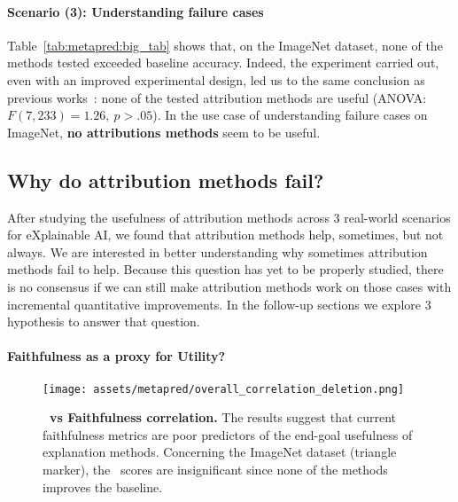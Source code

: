 \paragraph{Scenario (3): Understanding failure cases}

Table~\ref{tab:metapred:big_tab} shows that, on the ImageNet dataset, none of the methods tested exceeded baseline accuracy.  Indeed, the experiment carried out, even with an improved experimental design, led us to the same conclusion as previous works~\cite{shen2020useful}: none of the tested attribution methods are useful (ANOVA: $F(7, 233) = 1.26,\ p>.05$). 
In the use case of understanding failure cases on ImageNet, \textbf{no attributions methods} seem to be useful.

\subsection*{Why do attribution methods fail?}
After studying the usefulness of attribution methods across 3 real-world scenarios for eXplainable AI, we found that attribution methods help, sometimes, but not always. We are interested in better understanding why sometimes attribution methods fail to help. Because this question has yet to be properly studied, there is no consensus if we can still make attribution methods work on those cases with incremental quantitative improvements. In the follow-up sections we explore 3 hypothesis to answer that question. 

\paragraph{Faithfulness as a proxy for Utility?} 
\begin{figure}[ht]
  \centering
  \begin{center}
    \texttt{[image: assets/metapred/overall\_correlation\_deletion.png]}
  \end{center}

  \caption{\textbf{\metric~vs Faithfulness correlation.}
        The results suggest that current faithfulness metrics are poor predictors of the end-goal usefulness of explanation methods. 
        Concerning the ImageNet dataset (triangle marker), the \metric~scores are insignificant since none of the methods improves the baseline.
        }
    \label{fig:metapred:correlations_plot}
\end{figure}


